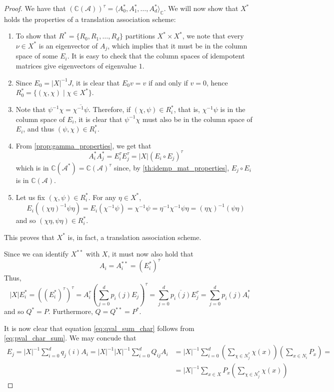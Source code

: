 \documentclass[a4paper,12pt]{article}
\theoremstyle{plain}
\theoremstyle{definition}
\theoremstyle{remark}
\begin{document}
\begin{proof}
    We have that $ (\mathbb{C}(\mathcal{A}))^{\tau} =
    \langle A_0^*, A_1^*, \dots, A_d^* \rangle_{\mathbb{C}} $. We will now show
    that $ X^* $ holds the properties of a translation association scheme:
    \begin{enumerate}[label=(\roman*)]
        \item To show that $ R^* = \{ R_0, R_1, \dots, R_d \} $ partitions
            $ X^* \times X^* $, we note that every $ \nu \in X^* $ is an
            eigenvector of $ A_j $, which implies that it must be in the column
            space of some $ E_i $. It is easy to check that the column spaces of
            idempotent matrices give eigenvectors of eigenvalue $ 1 $.
        \item Since $ E_0 = |X|^{-1}J $, it is clear that $ E_0 v = v $ if and
            only if $ v = 0 $, hence $ R^*_0 = \{ (\chi,\chi) \mid \chi \in X^* \} $.
        \item Note that $ \psi^{-1}\chi = \overline{\chi^{-1}\psi} $. Therefore,
            if $ (\chi,\psi) \in R_i^* $, that is, $ \chi^{-1}\psi $ is in the
            column space of $ E_i $, it is clear that $ \psi^{-1}\chi $ must
            also be in the column space of $ E_i $, and thus
            $ (\psi,\chi) \in R_i^* $.
        \item From \ref{prop:gamma_properties}, we get that
            \[ A_i^* A_j^* = E_i^{\tau}E_j^{\tau} = |X|(E_i \circ E_j)^{\tau} \]
            which is in $ \mathbb{C}(\mathcal{A}^*) = \mathbb{C}(\mathcal{A})^{\tau} $
            since, by \ref{th:idemp_mat_properties}, $ E_j \circ E_i $ is in
            $ \mathbb{C}(\mathcal{A}) $.
        \item Let us fix $ (\chi,\psi) \in R_i^* $. For any $ \eta \in X^* $,
        \[
            E_i((\chi\eta)^{-1}\psi\eta) = E_i(\chi^{-1}\psi) = \chi^{-1}\psi =
            \eta^{-1}\chi^{-1}\psi\eta = (\eta\chi)^{-1}(\psi\eta)
        \]
        and so $ (\chi\eta, \psi\eta) \in R_i^* $.
    \end{enumerate}
    This proves that $ X^* $ is, in fact, a translation association scheme.

    Since we can identify $ X^{**} $ with $ X $, it must now also hold that
    \[ A_i = A_i^{**} = (E_i^*)^{\tau}  \]
    Thus,
    \[
        |X| E_i^* = ((E_i^*)^{\tau})^{\tau} = A_i^{\tau}
        \left ( \sum_{ j=0 }^{ d } p_i(j) E_j \right )^{\tau} =
        \sum_{ j=0 }^{ d } \overline{p_i(j)}E_j^{\tau} =
        \sum_{ j=0 }^{ d } p_i(j) A_i^*
    \]
    and so $ Q^* = P $. Furthermore, $ Q = Q^{**} = P^* $.

    It is now clear that equation \eqref{eq:qval_sum_char} follows from
    \eqref{eq:pval_char_sum}. We may concude that
    \[
        \begin{split}
        E_j = |X|^{-1} \sum_{ i=0 }^{ d } q_j(i)A_i = |X|^{-1}
        |X|^{-1} \sum_{ i=0 }^{ d } Q_{ij}A_i &=
        |X|^{-1} \sum_{ i=0 }^{ d } \left ( \sum_{ \chi \in N_j^*} \chi(x) \right )
            \left ( \sum_{ x \in N_i} P_x \right ) = \\
        &= |X|^{-1} \sum_{ x \in X } P_x \left ( \sum_{ \chi \in N_j^*} \chi(x) \right )
        \end{split}
    \]
\end{proof}
\end{document}
